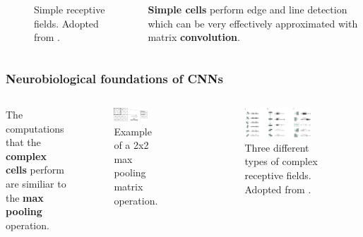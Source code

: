 \documentclass[a4paper,9pt]{beamer}
\theoremstyle{mytheoremstyle}
\begin{document}
\begin{frame}
\begin{columns}
\begin{figure}
\begin{center}
\end{center}
	\caption{Simple receptive fields. Adopted from \parencite{hubel1962}.}
\end{figure}
\vspace{0.7cm}
\scriptsize{
\begin{exampleblock}{}
\textbf{Simple cells} perform edge and line detection which can be very effectively approximated with matrix \textbf{convolution}.
\end{exampleblock}
}
\end{columns}
\end{frame}


\begin{frame}
\frametitle{Neurobiological foundations of CNNs}
\begin{columns}
\scriptsize{
\begin{exampleblock}{}
The computations that the \textbf{complex cells} perform are similiar to the \textbf{max pooling} operation.
\end{exampleblock}
}
\begin{figure}
\begin{center}
  \includegraphics[width=0.75\textwidth]{res/max_pooling.png}
\end{center}
	\caption{Example of a 2x2 max pooling matrix operation.}
\end{figure}
\hrule
\begin{figure}
\begin{center}
  \includegraphics[width=0.75\textwidth]{res/complex_cells.png}
\end{center}
	\caption{Three different types of complex receptive fields. Adopted from \parencite{hubel1962}.}
\end{figure}
\end{columns}
\end{frame}
\end{document}
